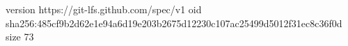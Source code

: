 version https://git-lfs.github.com/spec/v1
oid sha256:485cf9b2d62e1e94a6d19e203b2675d12230c107ac25499d5012f31ec8c36f0d
size 73
